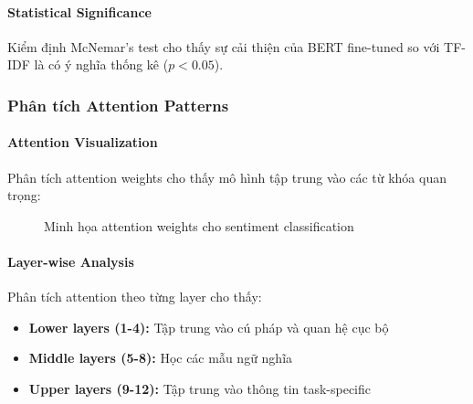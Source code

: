 \paragraph{Statistical Significance}
Kiểm định McNemar's test cho thấy sự cải thiện của BERT fine-tuned so với TF-IDF là có ý nghĩa thống kê ($p < 0.05$).

\subsubsection{Phân tích Attention Patterns}

\paragraph{Attention Visualization}
Phân tích attention weights cho thấy mô hình tập trung vào các từ khóa quan trọng:

\begin{figure}[H]
\centering
{}
\caption{Minh họa attention weights cho sentiment classification}
\label{fig:attention_viz}
\end{figure}

\paragraph{Layer-wise Analysis}
Phân tích attention theo từng layer cho thấy:
\begin{itemize}
    \item \textbf{Lower layers (1-4):} Tập trung vào cú pháp và quan hệ cục bộ
    \item \textbf{Middle layers (5-8):} Học các mẫu ngữ nghĩa  
    \item \textbf{Upper layers (9-12):} Tập trung vào thông tin task-specific
\end{itemize}

